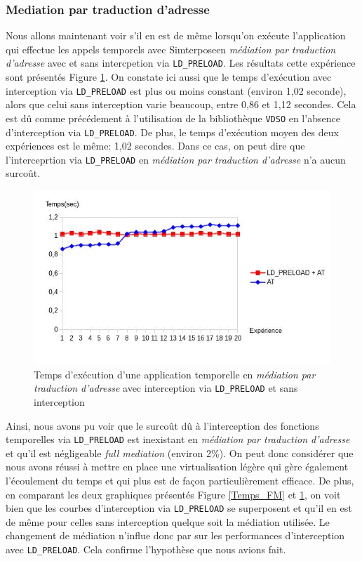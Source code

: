 \subsubsection{Mediation par traduction d'adresse}
Nous allons maintenant voir s'il en est de même  lorsqu'on exécute l'application qui effectue les appels temporels avec Simterposeen \textit{médiation par traduction d'adresse} avec et sans intercpetion via \texttt{LD\_PRELOAD}. Les résultats cette expérience sont présentés Figure \ref{Temps_AT}. On constate ici aussi que le temps d'exécution avec interception via \texttt{LD\_PRELOAD} est plus ou moins constant (environ 1,02 seconde), alors que celui sans interception varie beaucoup, entre 0,86 et 1,12 secondes. Cela est dû comme précédement à l'utilisation de la bibliothèque \texttt{VDSO} en l'absence d'interception via \texttt{LD\_PRELOAD}. De plus, le temps d'exécution moyen des deux expériences est le même: 1,02 secondes. Dans ce cas, on peut dire que l'interceprtion via \texttt{LD\_PRELOAD} en \textit{médiation par traduction d'adresse} n'a aucun surcoût.

\begin{figure}[H]
  \centering
    \includegraphics[scale=0.65]{mesures/graph/Temps_AT.jpg}
    \caption{Temps d'exécution d'une application temporelle en \textit{médiation par traduction d'adresse} avec interception via \texttt{LD\_PRELOAD} et sans interception}
    \label{Temps_AT}
\end{figure}


Ainsi, nous avons pu voir que le surcoût dû à l'interception des fonctions temporelles via \texttt{LD\_PRELOAD} est inexistant en \textit{médiation par traduction d'adresse} et qu'il est négligeable \textit{full mediation} (environ 2\%). On peut donc considérer que nous avons réussi à mettre en place une virtualisation légère qui gère également l'écoulement du temps et qui plus est de façon particulièrement efficace. De plus, en comparant les deux graphiques présentés Figure \ref{Temps_FM} et \ref{Temps_AT}, on voit bien que les courbes d'interception via \texttt{LD\_PRELOAD} se superposent et qu'il en est de même pour celles sans interception quelque soit la médiation utilisée. Le changement de médiation n'influe donc par sur les performances d'interception avec \texttt{LD\_PRELOAD}. Cela confirme l'hypothèse que nous avions fait.

\vspace{0.5cm}
